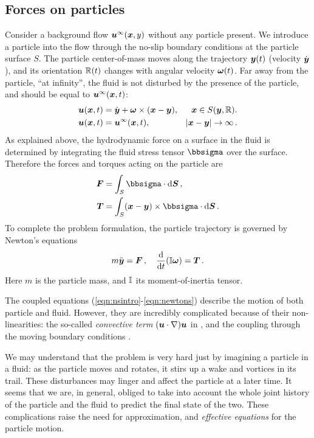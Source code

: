 \documentclass[thesis.tex]{subfiles}
\begin{document}
\subsection{Forces on particles}

Consider a background flow $\mbox{\boldmath$u$}^\infty(\mbox{\boldmath$x$},y)$ without any particle present. We introduce a particle into the flow through the no-slip boundary conditions at the particle surface $S$. The particle center-of-mass moves along the trajectory $\mbox{\boldmath$y$}(t)$ (velocity $\dot{\mbox{\boldmath$y$}}$), and its orientation $\mathbb{R}(t)$ changes with angular velocity $\mbox{\boldmath$\omega$}(t)$.  Far away from the particle, ``at infinity'', the fluid is not disturbed by the presence of the particle, and should be equal to $\mbox{\boldmath$u$}^\infty(\mbox{\boldmath$x$},t)$:
\begin{align}
    \ve u(\ve x, t) &= \dot{\ve y} + \ve \omega \cross (\ve x - \ve y), & \ve x \in S(\ve y, \ma R). \nn\\
    \ve u(\ve x, t) &= \ve u^\infty(\ve x, t), & |\ve x-\ve y|\to\infty\,.\eqnlab{nsbc}
\end{align}
As explained above, the hydrodynamic force on a surface in the fluid is determined by integrating the fluid stress tensor $\bbsigma$ over the surface. Therefore the forces and torques acting on the particle are
\begin{align}
    \ve F &= \int_S \bbsigma \cdot \rd \ve S\,, \nn\\
    \ve T &= \int_S (\ve x - \ve y) \cross \bbsigma \cdot \rd \ve S\,. \eqnlab{nsforces}
\end{align}
To complete the problem formulation, the particle trajectory is governed by Newton's equations
\begin{align}
    m\ddot{\ve y} = \ve F\,, \quad \diff{}{t}(\ma I \ve \omega) = \ve T\,. \eqnlab{newtons}
\end{align}
Here $m$ is the particle mass, and $\mathbb{I}$ its moment-of-inertia tensor.

The coupled equations (\ref{eqn:nsintro}-\ref{eqn:newtons}) describe the motion of both particle and fluid. However, they are incredibly complicated because of their non-linearities: the so-called \emph{convective term} $(\mbox{\boldmath$u$} \cdot \nabla) \mbox{\boldmath$u$}$ in , and the coupling through the moving boundary conditions .

We may understand that the problem is very hard just by imagining a particle in a fluid: as the particle moves and rotates, it stirs up a wake and vortices in its trail. These disturbances may linger and affect the particle at a later time. It seems that we are, in general, obliged to take into account the whole joint history of the particle and the fluid to predict the final state of the two. These complications raise the need for approximation, and \emph{effective equations} for the particle motion.
\end{document}
